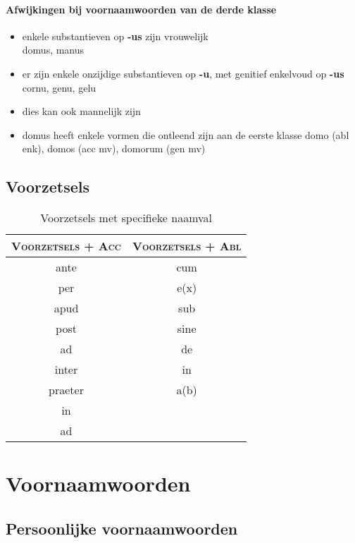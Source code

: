 \documentclass[12pt,a4paper]{article}
\begin{document}
\paragraph{Afwijkingen bij voornaamwoorden van de derde klasse}
\begin{itemize}
    \item enkele substantieven op \textbf{-us} zijn vrouwelijk \\
        domus, manus
    \item er zijn enkele onzijdige substantieven op \textbf{-u}, met genitief enkelvoud op \textbf{-us} \\
        cornu, genu, gelu
    \item dies kan ook mannelijk zijn
    \item domus heeft enkele vormen die ontleend zijn aan de eerste klasse
        domo (abl enk), domos (acc mv), domorum (gen mv)
\end{itemize}



\subsection{Voorzetsels}

\begin{table}[H]
\centering
\begin{tabular}{ c | c }
\toprule
\textsc{Voorzetsels + Acc} & \textsc{Voorzetsels + Abl} \\
\midrule
ante    & cum \\
per     & e(x) \\
apud    & sub \\
post    & sine \\
ad      & de \\
inter   & in \\
praeter & a(b) \\
in      & \\
ad      & \\
\bottomrule
\end{tabular}
\caption{Voorzetsels met specifieke naamval}
\label{tab:voorz}
\end{table}


\section{Voornaamwoorden}

\subsection{Persoonlijke voornaamwoorden}
\end{document}
